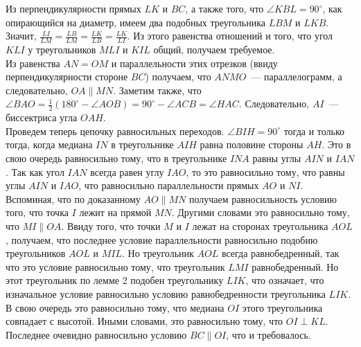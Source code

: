 Из перпендикулярности прямых $LK$ и $BC$, а также того, что
$\angle KBL = 90^\circ$, как опирающийся на диаметр, имеем два подобных
треугольника $LBM$ и $LKB$.
Значит, $\frac{LI}{LM} = \frac{LB}{LM} = \frac{LK}{LB} = \frac{LK}{LI}$.
Из этого равенства отношений и того, что угол $KLI$ у треугольников $MLI$ и
$KIL$ общий, получаем требуемое.
\\
Из равенства $AN = OM$ и параллельности этих отрезков
(ввиду перпендикулярности стороне $BC$) получаем, что $ANMO$~---
параллелограмм, а следовательно, $OA \parallel MN$.
Заметим также, что
\(
    \angle BAO
=
    \frac{1}{2}(180^\circ - \angle AOB)
=
    90^\circ - \angle ACB = \angle HAC
\).
Следовательно, $AI$~--- биссектриса угла $OAH$.
\\
Проведем теперь цепочку равносильных переходов.
$\angle BIH = 90^\circ$ тогда и только тогда, когда медиана $IN$ в треугольнике
$AIH$ равна половине стороны $AH$.
Это в свою очередь равносильно тому, что в треугольнике $INA$ равны углы $AIN$
и $IAN$.
Так как угол $IAN$ всегда равен углу $IAO$, то это равносильно тому, что равны
углы $AIN$ и $IAO$, что равносильно параллельности прямых $AO$ и $NI$.
Вспоминая, что по доказанному $AO \parallel MN$ получаем равносильность условию
того, что точка $I$ лежит на прямой $MN$.
Другими словами это равносильно тому, что $MI \parallel OA$.
Ввиду того, что точки $M$ и $I$ лежат на сторонах треугольника $AOL$, получаем,
что последнее условие параллельности равносильно подобию треугольников $AOL$ и
$MIL$.
Но треугольник $AOL$ всегда равнобедренный, так что это условие равносильно
тому, что треугольник $LMI$ равнобедренный.
Но этот треугольник по лемме 2 подобен треугольнику $LIK$, что означает, что
изначальное условие равносильно условию равнобедренности треугольника $LIK$.
В свою очередь это равносильно тому, что медиана $OI$ этого треугольника
совпадает с высотой.
Иными словами, это равносильно тому, что $OI \perp KL$.
Последнее очевидно равносильно условию $BC \parallel OI$, что и требовалось.
\endproblem
